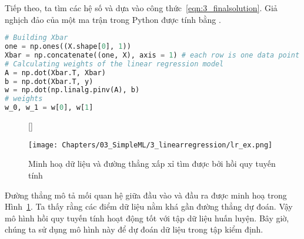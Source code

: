 Tiếp theo, ta tìm các hệ số  và
 dựa vào công thức~\eqref{eqn:3_finalsolution}. Giả
nghịch đảo của một ma trận  trong Python được tính bằng
.%




\begin{lstlisting}[language=Python]
# Building Xbar 
one = np.ones((X.shape[0], 1))
Xbar = np.concatenate((one, X), axis = 1) # each row is one data point 
# Calculating weights of the linear regression model
A = np.dot(Xbar.T, Xbar)
b = np.dot(Xbar.T, y)
w = np.dot(np.linalg.pinv(A), b)
# weights
w_0, w_1 = w[0], w[1]
\end{lstlisting}




\begin{figure}[t]
    [\FBwidth]
    {\caption{
    Minh hoạ dữ liệu và đường thẳng xấp xỉ tìm được bởi hồi quy tuyến tính
    }
    \label{fig:3_2}}
    { %
    \texttt{[image: Chapters/03\_SimpleML/3\_linearregression/lr\_ex.png]}
    }
\end{figure}
Đường thẳng mô tả mối quan hệ giữa đầu vào và đầu ra được minh hoạ trong
Hình~\ref{fig:3_2}. Ta thấy rằng các điểm dữ liệu nằm khá gần đường thẳng dự
đoán. Vậy mô hình hồi quy tuyến tính hoạt động tốt với tập dữ liệu huấn luyện.
Bây giờ, chúng ta sử dụng mô hình này để dự đoán dữ liệu trong tập kiểm định.

